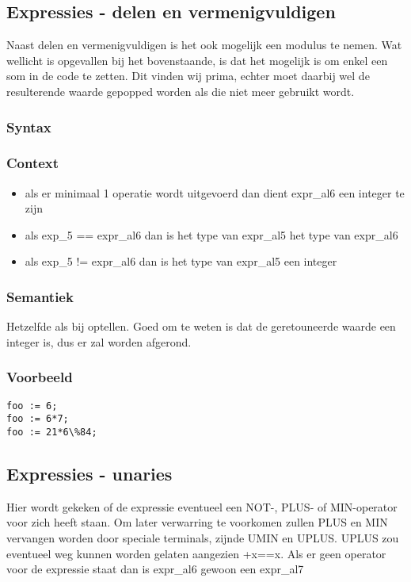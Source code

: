 \documentclass[]{article}
\begin{document}
\subsection{Expressies - delen en vermenigvuldigen}
Naast delen en vermenigvuldigen is het ook mogelijk een modulus te nemen.
Wat wellicht is opgevallen bij het bovenstaande, is dat het mogelijk is om enkel een som in de code te zetten. Dit vinden wij prima, echter moet daarbij wel de resulterende waarde gepopped worden als die niet meer gebruikt wordt.
\subsubsection{Syntax}

\subsubsection{Context}
\begin{itemize}
\item als er minimaal 1 operatie wordt uitgevoerd dan dient expr\_al6 een integer te zijn
\item als exp\_5 == expr\_al6 dan is het type van expr\_al5 het type van expr\_al6
\item als exp\_5 != expr\_al6 dan is het type van expr\_al5 een integer
\end{itemize}
\subsubsection{Semantiek}
Hetzelfde als bij optellen. Goed om te weten is dat de geretouneerde waarde een integer is, dus er zal worden afgerond.
\subsubsection{Voorbeeld}
\begin{lstlisting}[style=SELMA]
foo := 6;
foo := 6*7;
foo := 21*6\%84;
\end{lstlisting}


\subsection{Expressies - unaries}
Hier wordt gekeken of de expressie eventueel een NOT-, PLUS- of MIN-operator voor zich heeft staan.
Om later verwarring te voorkomen zullen PLUS en MIN vervangen worden door speciale terminals, zijnde UMIN en UPLUS. UPLUS zou eventueel weg kunnen worden gelaten aangezien +x==x.
Als er geen operator voor de expressie staat dan is expr\_al6 gewoon een expr\_al7
\end{document}
